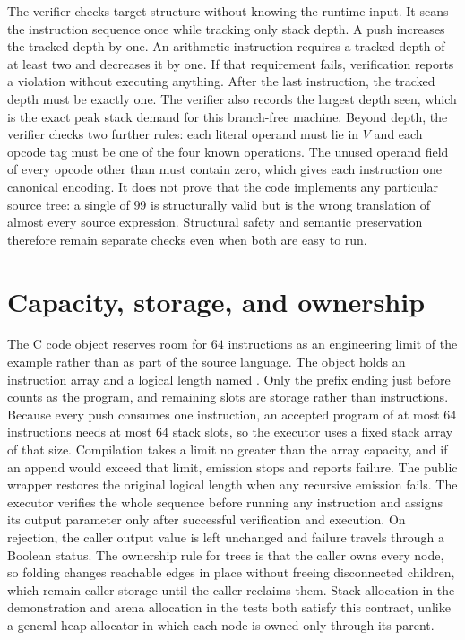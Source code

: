 The verifier checks target structure without knowing the runtime input.
It scans the instruction sequence once while tracking only stack depth.
A push increases the tracked depth by one.
An arithmetic instruction requires a tracked depth of at least two and decreases it by one.
If that requirement fails, verification reports a violation without executing anything.
After the last instruction, the tracked depth must be exactly one.
The verifier also records the largest depth seen, which is the exact peak stack demand for this branch-free machine.
Beyond depth, the verifier checks two further rules: each literal operand must lie in $V$ and each opcode tag must be one of the four known operations.
The unused operand field of every opcode other than  must contain zero, which gives each instruction one canonical encoding.
It does not prove that the code implements any particular source tree: a single  of $99$ is structurally valid but is the wrong translation of almost every source expression.
Structural safety and semantic preservation therefore remain separate checks even when both are easy to run.

\section{Capacity, storage, and ownership}
\label{sec:app-a-storage}

The C code object reserves room for $64$ instructions as an engineering limit of the example rather than as part of the source language.
The object holds an instruction array and a logical length named .
Only the prefix ending just before  counts as the program, and remaining slots are storage rather than instructions.
Because every push consumes one instruction, an accepted program of at most $64$ instructions needs at most $64$ stack slots, so the executor uses a fixed stack array of that size.
Compilation takes a limit no greater than the array capacity, and if an append would exceed that limit, emission stops and reports failure.
The public wrapper restores the original logical length when any recursive emission fails.
The executor verifies the whole sequence before running any instruction and assigns its output parameter only after successful verification and execution.
On rejection, the caller output value is left unchanged and failure travels through a Boolean status.
The ownership rule for trees is that the caller owns every node, so folding changes reachable edges in place without freeing disconnected children, which remain caller storage until the caller reclaims them.
Stack allocation in the demonstration and arena allocation in the tests both satisfy this contract, unlike a general heap allocator in which each node is owned only through its parent.

